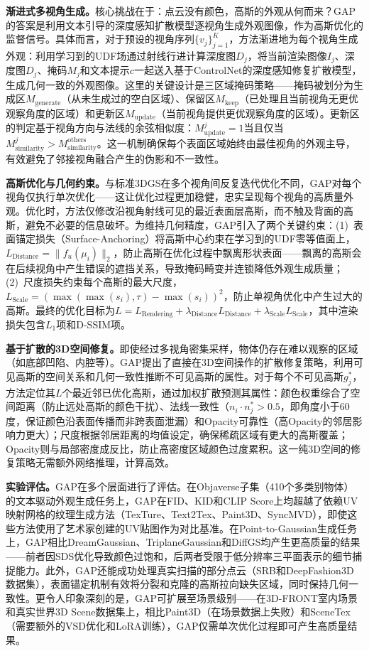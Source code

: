 \textbf{渐进式多视角生成。}核心挑战在于：点云没有颜色，高斯的外观从何而来？GAP的答案是利用文本引导的深度感知扩散模型逐视角生成外观图像，作为高斯优化的监督信号。具体而言，对于预设的视角序列$\{v_j\}_{j=1}^K$，方法渐进地为每个视角生成外观：利用学习到的UDF场通过射线行进计算深度图$D_j$，将当前渲染图像$I_j$、深度图$D_j$、掩码$M_j$和文本提示$c$一起送入基于ControlNet的深度感知修复扩散模型，生成几何一致的外观图像。这里的关键设计是三区域掩码策略——掩码被划分为生成区$M_{\text{generate}}$（从未生成过的空白区域）、保留区$M_{\text{keep}}$（已处理且当前视角无更优观察角度的区域）和更新区$M_{\text{update}}$（当前视角提供更优观察角度的区域）。更新区的判定基于视角方向与法线的余弦相似度：$M_{\text{update}}^j = 1$当且仅当$M_{\text{similarity}}^j > M_{\text{similarity}}^{\text{others}}$。这一机制确保每个表面区域始终由最佳视角的外观主导，有效避免了邻接视角融合产生的伪影和不一致性。

\textbf{高斯优化与几何约束。}与标准3DGS在多个视角间反复迭代优化不同，GAP对每个视角仅执行单次优化——这让优化过程更加稳健，忠实呈现每个视角的高质量外观。优化时，方法仅修改沿视角射线可见的最近表面层高斯，而不触及背面的高斯，避免不必要的信息破坏。为维持几何精度，GAP引入了两个关键约束：(1)~表面锚定损失（Surface-Anchoring）将高斯中心约束在学习到的UDF零等值面上，$L_{\text{Distance}} = \|f_u(\mu_i)\|_2$，防止高斯在优化过程中飘离形状表面——飘离的高斯会在后续视角中产生错误的遮挡关系，导致掩码畸变并连锁降低外观生成质量；(2)~尺度损失约束每个高斯的最大尺度，$L_{\text{Scale}} = (\max(\max(s_i), \tau) - \max(s_i))^2$，防止单视角优化中产生过大的高斯。最终的优化目标为$L = L_{\text{Rendering}} + \lambda_{\text{Distance}} L_{\text{Distance}} + \lambda_{\text{Scale}} L_{\text{Scale}}$，其中渲染损失包含$L_1$项和D-SSIM项。

\textbf{基于扩散的3D空间修复。}即使经过多视角密集采样，物体仍存在难以观察的区域（如底部凹陷、内腔等）。GAP提出了直接在3D空间操作的扩散修复策略，利用可见高斯的空间关系和几何一致性推断不可见高斯的属性。对于每个不可见高斯$g_j^*$，方法定位其$L$个最近邻已优化高斯，通过加权扩散预测其属性：颜色权重综合了空间距离（防止远处高斯的颜色干扰）、法线一致性（$n_i \cdot n_j^* > 0.5$，即角度小于60度，保证颜色沿表面传播而非跨表面泄漏）和Opacity可靠性（高Opacity的邻居影响力更大）；尺度根据邻居距离的均值设定，确保稀疏区域有更大的高斯覆盖；Opacity则与局部密度成反比，防止高密度区域颜色过度累积。这一纯3D空间的修复策略无需额外网络推理，计算高效。

\textbf{实验评估。}GAP在多个层面进行了评估。在Objaverse子集（410个多类别物体）的文本驱动外观生成任务上，GAP在FID、KID和CLIP Score上均超越了依赖UV映射网格的纹理生成方法（TexTure、Text2Tex、Paint3D、SyncMVD），即使这些方法使用了艺术家创建的UV贴图作为对比基准。在Point-to-Gaussian生成任务上，GAP相比DreamGaussian、TriplaneGaussian和DiffGS均产生更高质量的结果——前者因SDS优化导致颜色过饱和，后两者受限于低分辨率三平面表示的细节捕捉能力。此外，GAP还能成功处理真实扫描的部分点云（SRB和DeepFashion3D数据集），表面锚定机制有效将分裂和克隆的高斯拉向缺失区域，同时保持几何一致性。更令人印象深刻的是，GAP可扩展至场景级别——在3D-FRONT室内场景和真实世界3D Scene数据集上，相比Paint3D（在场景数据上失败）和SceneTex（需要额外的VSD优化和LoRA训练），GAP仅需单次优化过程即可产生高质量结果。

